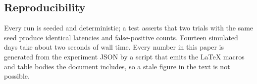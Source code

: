 \subsection{Reproducibility}

Every run is seeded and deterministic; a test asserts that two trials with the
same seed produce identical latencies and false-positive counts. Fourteen
simulated days take about two seconds of wall time. Every number in this paper is
generated from the experiment JSON by a script that emits the LaTeX macros and
table bodies the document includes, so a stale figure in the text is not possible.
